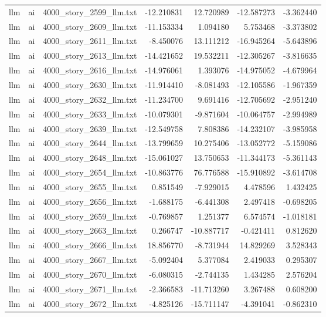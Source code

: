 \begin{longtable}{lllrrrr}
llm & ai & 4000\_story\_2599\_llm.txt & -12.210831 & 12.720989 & -12.587273 & -3.362440 \\
llm & ai & 4000\_story\_2609\_llm.txt & -11.153334 & 1.094180 & 5.753468 & -3.373802 \\
llm & ai & 4000\_story\_2611\_llm.txt & -8.450076 & 13.111212 & -16.945264 & -5.643896 \\
llm & ai & 4000\_story\_2613\_llm.txt & -14.421652 & 19.532211 & -12.305267 & -3.816635 \\
llm & ai & 4000\_story\_2616\_llm.txt & -14.976061 & 1.393076 & -14.975052 & -4.679964 \\
llm & ai & 4000\_story\_2630\_llm.txt & -11.914410 & -8.081493 & -12.105586 & -1.967359 \\
llm & ai & 4000\_story\_2632\_llm.txt & -11.234700 & 9.691416 & -12.705692 & -2.951240 \\
llm & ai & 4000\_story\_2633\_llm.txt & -10.079301 & -9.871604 & -10.064757 & -2.994989 \\
llm & ai & 4000\_story\_2639\_llm.txt & -12.549758 & 7.808386 & -14.232107 & -3.985958 \\
llm & ai & 4000\_story\_2644\_llm.txt & -13.799659 & 10.275406 & -13.052772 & -5.159086 \\
llm & ai & 4000\_story\_2648\_llm.txt & -15.061027 & 13.750653 & -11.344173 & -5.361143 \\
llm & ai & 4000\_story\_2654\_llm.txt & -10.863776 & 76.776588 & -15.910892 & -3.614708 \\
llm & ai & 4000\_story\_2655\_llm.txt & 0.851549 & -7.929015 & 4.478596 & 1.432425 \\
llm & ai & 4000\_story\_2656\_llm.txt & -1.688175 & -6.441308 & 2.497418 & -0.698205 \\
llm & ai & 4000\_story\_2659\_llm.txt & -0.769857 & 1.251377 & 6.574574 & -1.018181 \\
llm & ai & 4000\_story\_2663\_llm.txt & 0.266747 & -10.887717 & -0.421411 & 0.812620 \\
llm & ai & 4000\_story\_2666\_llm.txt & 18.856770 & -8.731944 & 14.829269 & 3.528343 \\
llm & ai & 4000\_story\_2667\_llm.txt & -5.092404 & 5.377084 & 2.419033 & 0.295307 \\
llm & ai & 4000\_story\_2670\_llm.txt & -6.080315 & -2.744135 & 1.434285 & 2.576204 \\
llm & ai & 4000\_story\_2671\_llm.txt & -2.366583 & -11.713260 & 3.267488 & 0.608200 \\
llm & ai & 4000\_story\_2672\_llm.txt & -4.825126 & -15.711147 & -4.391041 & -0.862310 \\

\end{longtable}
